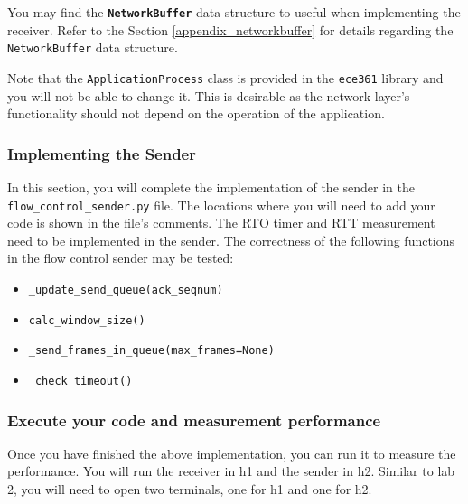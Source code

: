 \documentclass[11pt]{article}
\begin{document}
You may find the \textbf{\texttt{NetworkBuffer}} data structure to useful when implementing the receiver. Refer to the Section \ref{appendix_networkbuffer} for details regarding the \texttt{NetworkBuffer} data structure.

Note that the \texttt{ApplicationProcess} class is provided in the \texttt{ece361} library and you will not be able to change it. This is desirable as the network layer's functionality should not depend on the operation of the application.


\subsubsection{Implementing the Sender}
In this section, you will complete the implementation of the sender in the \texttt{flow\_control\_sender.py} file. The locations where you will need to add your code is shown in the file's comments. The RTO timer and RTT measurement need to be implemented in the sender. The correctness of the following functions in the flow control sender may be tested:

\begin{itemize}
    \item \texttt{\_update\_send\_queue(ack\_seqnum)}
    \item \texttt{calc\_window\_size()}
    \item \texttt{\_send\_frames\_in\_queue(max\_frames=None)}
    \item \texttt{\_check\_timeout()}
\end{itemize}


\subsubsection{Execute your code and measurement performance}
\label{mm_execute}
Once you have finished the above implementation, you can run it to measure the performance.
You will run the receiver in h1 and the sender in h2. Similar to lab 2, you will need to open two terminals, one for h1 and one for h2.
\end{document}
